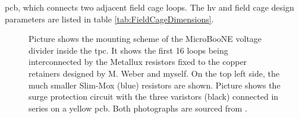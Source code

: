\gls{pcb}, which connects two adjacent field cage loops. The \gls{hv} and field cage design parameters are listed in table \ref{tab:FieldCageDimensions}.
\begin{figure}[htbp]
    \centering
    \caption[Pictures of MicroBooNE's Voltage Divider]{Picture  shows the mounting scheme of the MicroBooNE voltage divider inside the \gls{tpc}. It shows the first \num{16} loops being interconnected by the Metallux resistors fixed to the copper retainers designed by M. Weber and myself. On the top left side, the much smaller Slim-Mox (blue) resistors are shown. Picture  shows the surge protection circuit with the three varistors (black) connected in series on a yellow \gls{pcb}. Both photographs are sourced from \cite{MicroBooNEDetector}.}
    \label{fig:VoltageDividerPhotos}
\end{figure}
